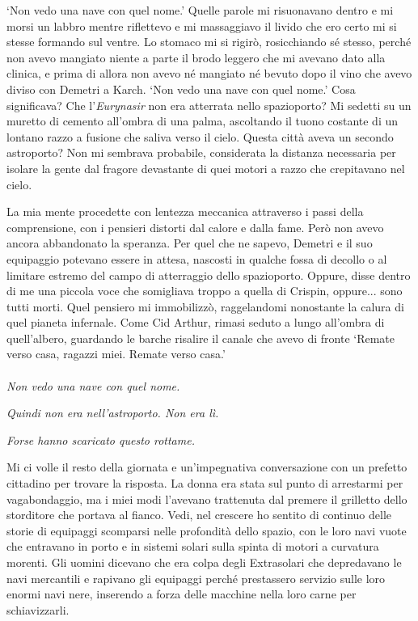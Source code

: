`Non vedo una nave con quel nome.' Quelle parole mi risuonavano dentro e
mi morsi un labbro mentre riflettevo e mi massaggiavo il livido che ero
certo mi si stesse formando sul ventre. Lo stomaco mi si rigirò,
rosicchiando sé stesso, perché non avevo mangiato niente a parte il
brodo leggero che mi avevano dato alla clinica, e prima di allora non
avevo né mangiato né bevuto dopo il vino che avevo diviso con Demetri a
Karch. `Non vedo una nave con quel nome.' Cosa significava? Che
l'\emph{Eurynasir} non era atterrata nello spazioporto? Mi sedetti su un
muretto di cemento all'ombra di una palma, ascoltando il tuono costante
di un lontano razzo a fusione che saliva verso il cielo. Questa città
aveva un secondo astroporto? Non mi sembrava probabile, considerata la
distanza necessaria per isolare la gente dal fragore devastante di quei
motori a razzo che crepitavano nel cielo.

La mia mente procedette con lentezza meccanica attraverso i passi della
comprensione, con i pensieri distorti dal calore e dalla fame. Però non
avevo ancora abbandonato la speranza. Per quel che ne sapevo, Demetri e
il suo equipaggio potevano essere in attesa, nascosti in qualche fossa
di decollo o al limitare estremo del campo di atterraggio dello
spazioporto. Oppure, disse dentro di me una piccola voce che somigliava
troppo a quella di Crispin, oppure... sono tutti morti. Quel pensiero mi
immobilizzò, raggelandomi nonostante la calura di quel pianeta
infernale. Come Cid Arthur, rimasi seduto a lungo all'ombra di
quell'albero, guardando le barche risalire il canale che avevo di fronte
`Remate verso casa, ragazzi miei. Remate verso casa.'
\leavevmode\\
\leavevmode\\
\textit{Non vedo una nave con quel nome.}

\textit{Quindi non era nell'astroporto. Non era lì.}

\textit{Forse hanno scaricato questo rottame.}

\begin{figure}
	\centering
	\def\svgwidth{\columnwidth}
	\scalebox{0.2}{}
\end{figure}

Mi ci volle il resto della giornata e un'impegnativa conversazione con
un prefetto cittadino per trovare la risposta. La donna era stata sul
punto di arrestarmi per vagabondaggio, ma i miei modi l'avevano
trattenuta dal premere il grilletto dello storditore che portava al
fianco. Vedi, nel crescere ho sentito di continuo delle storie di
equipaggi scomparsi nelle profondità dello spazio, con le loro navi
vuote che entravano in porto e in sistemi solari sulla spinta di motori
a curvatura morenti. Gli uomini dicevano che era colpa degli Extrasolari
che depredavano le navi mercantili e rapivano gli equipaggi perché
prestassero servizio sulle loro enormi navi nere, inserendo a forza
delle macchine nella loro carne per schiavizzarli.

